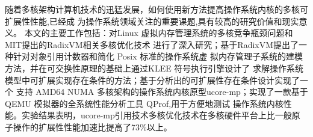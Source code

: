 

\makeatletter
\ifthu@bachelor\relax\else
  \ifthu@doctor
  \else
    \ifthu@master
    \fi
  \fi
\fi
\makeatother





\begin{cabstract}

随着多核架构计算机技术的迅猛发展，如何使用新方法提高操作系统内核的多核可扩展性性能,已经成
为操作系统领域关注的重要课题,具有较高的研究价值和现实意义。
本文的主要工作包括：对Linux 虚拟内存管理系统的多核竞争瓶颈问题和MIT提出的RadixVM相关多核优化技术
进行了深入研究；基于RadixVM提出了一种针对对象引用计数器和简化 Posix 标准的操作系统虚
拟内存管理子系统的建模方法，并在可交换性原理的基础上通过KLEE 符号执行引擎设计了
求解操作系统模型中可扩展实现存在条件的方法；基于分析出的可扩展性存在条件设计实现了一个
支持 AMD64 NUMA 多核架构的操作系统内核原型ucore-mp；实现了一款基于 QEMU 模拟器的全系统性能分析工具 QProf,用于方便地测试
操作系统内核性能。实验结果表明，ucore-mp引用技术多核优化技术在多核硬件平台上比一般原子操作的扩展性性能加速比提高了73\%以上。

\end{cabstract}

